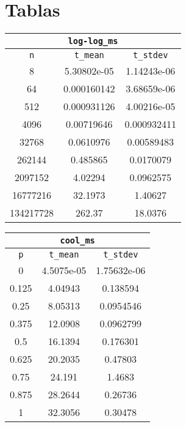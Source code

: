\documentclass{scrartcl}
\begin{document}
\section*{Tablas}

\begin{center}
\begin{tabular}{|c|c|c|}
    \hline
    \multicolumn{3}{|c|}{\texttt{log-log\_ms}} \\
    \hline
    \texttt{n} & \texttt{t\_mean} & \texttt{t\_stdev} \\
    \hline
    8 & 5.30802e-05 & 1.14243e-06 \\
    \hline
    64 & 0.000160142 & 3.68659e-06 \\
    \hline
    512 & 0.000931126 & 4.00216e-05 \\
    \hline
    4096 & 0.00719646 & 0.000932411 \\
    \hline
    32768 & 0.0610976 & 0.00589483 \\
    \hline
    262144 & 0.485865 & 0.0170079 \\
    \hline
    2097152 & 4.02294 & 0.0962575 \\
    \hline
    16777216 & 32.1973 & 1.40627 \\
    \hline
    134217728 & 262.37 & 18.0376 \\
    \hline
\end{tabular}

\begin{tabular}{|c|c|c|}
    \hline
    \multicolumn{3}{|c|}{\texttt{cool\_ms}} \\
    \hline
    \texttt{p} & \texttt{t\_mean} & \texttt{t\_stdev} \\
    \hline
    0 & 4.5075e-05 & 1.75632e-06 \\
    \hline
    0.125 & 4.04943 & 0.138594 \\
    \hline
    0.25 & 8.05313 & 0.0954546 \\
    \hline
    0.375 & 12.0908 & 0.0962799 \\
    \hline
    0.5 & 16.1394 & 0.176301 \\
    \hline
    0.625 & 20.2035 & 0.47803 \\
    \hline
    0.75 & 24.191 & 1.4683 \\
    \hline
    0.875 & 28.2644 & 0.26736 \\
    \hline
    1 & 32.3056 & 0.30478 \\
    \hline
\end{tabular}


\end{center}
\end{document}
